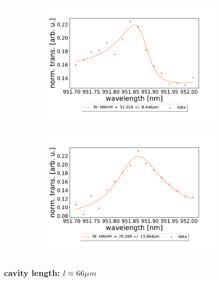 \begin{figure}[h!]
\begin{subfigure}[b]{0.49\textwidth}
        \includegraphics[width=\textwidth]{figures/results/double fano fits/120um_M3:M5_fit_5.pdf}
        \caption{}
        \label{fig:120um_M3:M5_fit_5}
    \end{subfigure}
    \begin{subfigure}[b]{0.49\textwidth}
        \includegraphics[width=\textwidth]{figures/results/double fano fits/120um_M3:M5_fit_6.pdf}
        \caption{}
        \label{fig:120um_M3:M5_fit_6}
    \end{subfigure}
\end{figure}

\clearpage
\subsubsection*{cavity length: $l \approx 66 \mu m$}

